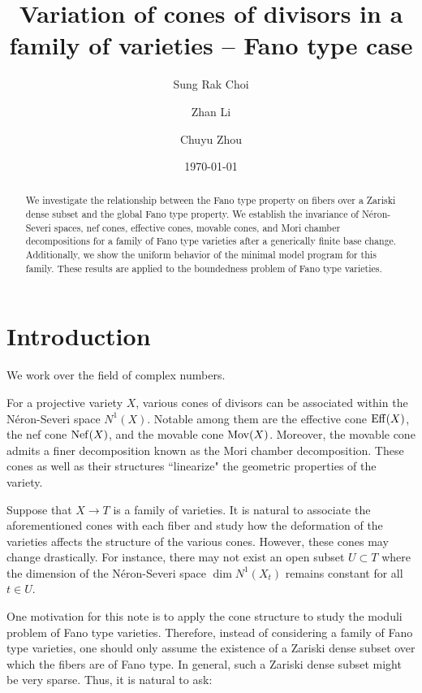 \documentclass[11pt,oneside,reqno]{amsart}
\title{Variation of cones of divisors in a family of varieties -- Fano type case}
\author{Sung Rak Choi}
\author{Zhan Li}
\author{Chuyu Zhou}
\date{} %
\numberwithin{equation}{section}
\theoremstyle{definition}
\newcommand{\Nef}{{\rm {Nef}}}
\newcommand{\Eff}{{\rm {Eff}}}
\newcommand{\Mov}{{\rm {Mov}}}
\begin{document}
\date{\today}

\begin{abstract}
We investigate the relationship between the Fano type property on fibers over a Zariski dense subset and the global Fano type property. We establish the invariance of N\'eron-Severi spaces, nef cones, effective cones, movable cones, and Mori chamber decompositions for a family of Fano type varieties after a generically finite base change. Additionally, we show the uniform behavior of the minimal model program for this family. These results are applied to the boundedness problem of Fano type varieties.
\end{abstract}

\maketitle



\setcounter{tocdepth}{1}



\tableofcontents



\section{Introduction}\label{sec: intro}

We work over the field of complex numbers.

For a projective variety $X$, various cones of divisors can be associated within the N\'eron-Severi space $N^1(X)$. Notable among them are the effective cone $\Eff(X)$, the nef cone $\Nef(X)$, and the movable cone $\Mov(X)$. Moreover, the movable cone admits a finer decomposition known as the Mori chamber decomposition. These cones as well as their structures ``linearize" the geometric properties of the variety. 

Suppose that $X \to T$ is a family of varieties. It is natural to associate the aforementioned cones with each fiber and study how the deformation of the varieties affects the structure of the various cones. However, these cones may change drastically. For instance, there may not exist an open subset $U \subset T$ where the dimension of the N\'eron-Severi space $\dim N^1(X_t)$ remains constant for all $t \in U$.  

One motivation for this note is to apply the cone structure to study the moduli problem of Fano type varieties. Therefore, instead of considering a family of Fano type varieties, one should only assume the existence of a Zariski dense subset over which the fibers are of Fano type. In general, such a Zariski dense subset might be very sparse. Thus, it is natural to ask:
\end{document}
